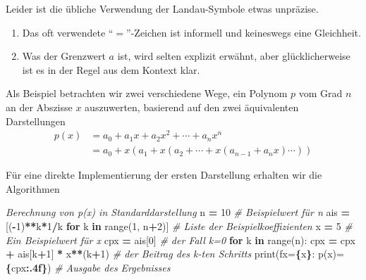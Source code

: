 \documentclass[
]{book}
\newenvironment{Shaded}{\begin{snugshade}}{\end{snugshade}}
\newcommand{\BuiltInTok}[1]{#1}
\newcommand{\CommentTok}[1]{\textcolor[rgb]{0.56,0.35,0.01}{\textit{#1}}}
\newcommand{\ControlFlowTok}[1]{\textcolor[rgb]{0.13,0.29,0.53}{\textbf{#1}}}
\newcommand{\DecValTok}[1]{\textcolor[rgb]{0.00,0.00,0.81}{#1}}
\newcommand{\KeywordTok}[1]{\textcolor[rgb]{0.13,0.29,0.53}{\textbf{#1}}}
\newcommand{\NormalTok}[1]{#1}
\newcommand{\OperatorTok}[1]{\textcolor[rgb]{0.81,0.36,0.00}{\textbf{#1}}}
\newcommand{\SpecialCharTok}[1]{\textcolor[rgb]{0.81,0.36,0.00}{\textbf{#1}}}
\newcommand{\SpecialStringTok}[1]{\textcolor[rgb]{0.31,0.60,0.02}{#1}}
\providecommand{\tightlist}{%
  \setlength{\itemsep}{0pt}\setlength{\parskip}{0pt}}
\theoremstyle{definition}
\theoremstyle{definition}
\theoremstyle{definition}
\theoremstyle{definition}
\theoremstyle{remark}
\begin{document}
Leider ist die übliche Verwendung der Landau-Symbole etwas unpräzise.

\begin{enumerate}
\def\labelenumi{\arabic{enumi}.}
\tightlist
\item
  Das oft verwendete ``\(=\)''-Zeichen ist informell und keineswegs eine Gleichheit.
\item
  Was der Grenzwert \(a\) ist, wird selten explizit erwähnt, aber glücklicherweise ist es in der Regel aus dem Kontext klar.
\end{enumerate}

Als Beispiel betrachten wir zwei verschiedene Wege, ein Polynom \(p\) vom Grad \(n\) an der Abszisse \(x\) auszuwerten, basierend auf den zwei äquivalenten Darstellungen
\begin{equation*}
\begin{split}
p(x) &= a_0 + a_1x +  a_2x^2+ \dotsm + a_nx^n \\
     &= a_0 + x(a_1 + x(a_2 + \dotsm +x(a_{n-1} + a_nx) \dotsm ))
\end{split}
\end{equation*}

Für eine direkte Implementierung der ersten Darstellung erhalten wir die Algorithmen

\begin{Shaded}
\begin{Highlighting}[]
\CommentTok{\textquotesingle{}\textquotesingle{}\textquotesingle{}Berechnung von p(x) in Standarddarstellung}
\CommentTok{\textquotesingle{}\textquotesingle{}\textquotesingle{}}
\NormalTok{n }\OperatorTok{=} \DecValTok{10}                                      \CommentTok{\# Beispielwert für n}
\NormalTok{ais }\OperatorTok{=}\NormalTok{ [(}\OperatorTok{{-}}\DecValTok{1}\NormalTok{)}\OperatorTok{**}\NormalTok{k}\OperatorTok{*}\DecValTok{1}\OperatorTok{/}\NormalTok{k }\ControlFlowTok{for}\NormalTok{ k }\KeywordTok{in} \BuiltInTok{range}\NormalTok{(}\DecValTok{1}\NormalTok{, n}\OperatorTok{+}\DecValTok{2}\NormalTok{)]  }\CommentTok{\# Liste der Beispielkoeffizienten}
\NormalTok{x }\OperatorTok{=} \DecValTok{5}                                       \CommentTok{\# Ein Beispielwert für x}
\NormalTok{cpx }\OperatorTok{=}\NormalTok{ ais[}\DecValTok{0}\NormalTok{]                                }\CommentTok{\# der Fall k=0}
\ControlFlowTok{for}\NormalTok{ k }\KeywordTok{in} \BuiltInTok{range}\NormalTok{(n):}
\NormalTok{    cpx }\OperatorTok{=}\NormalTok{ cpx }\OperatorTok{+}\NormalTok{ ais[k}\OperatorTok{+}\DecValTok{1}\NormalTok{] }\OperatorTok{*}\NormalTok{ x}\OperatorTok{**}\NormalTok{(k}\OperatorTok{+}\DecValTok{1}\NormalTok{)         }\CommentTok{\# der Beitrag des k{-}ten Schritts}
\BuiltInTok{print}\NormalTok{(}\SpecialStringTok{f\textquotesingle{}x=}\SpecialCharTok{\{}\NormalTok{x}\SpecialCharTok{\}}\SpecialStringTok{: p(x)=}\SpecialCharTok{\{}\NormalTok{cpx}\SpecialCharTok{:.4f\}}\SpecialStringTok{\textquotesingle{}}\NormalTok{)             }\CommentTok{\# Ausgabe des Ergebnisses}
\end{Highlighting}
\end{Shaded}
\end{document}

